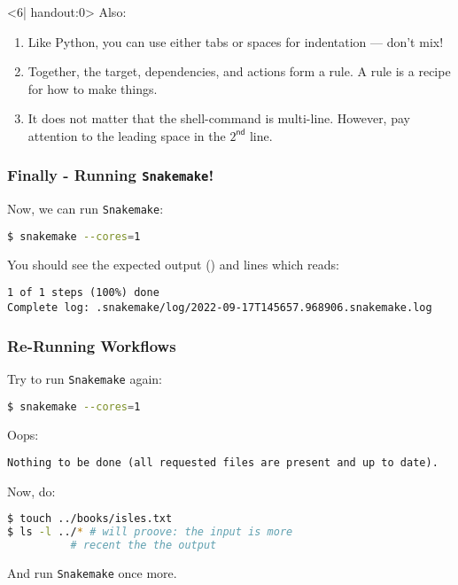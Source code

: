 \begin{frame}[fragile]
\begin{onlyenv}
  \end{onlyenv}
  \begin{onlyenv}<6| handout:0>
  Also:
  \begin{enumerate}
   \item Like Python, you can use either tabs or spaces for indentation — don’t mix!
   \item Together, the target, dependencies, and actions form a rule. A rule is a recipe for how to make things.
   \item It does not matter that the shell-command is multi-line. However, pay attention to the leading space in the $2^\mathsf{nd}$ line.
  \end{enumerate}
  \end{onlyenv}
\end{frame}

\begin{frame}[fragile]
  \frametitle{Finally - Running \texttt{Snakemake}!}
  Now, we can run \texttt{Snakemake}:
  \begin{lstlisting}[language=Bash, style=Shell]
$ snakemake --cores=1
  \end{lstlisting}
  You should see the expected output () and lines which reads:
  \begin{lstlisting}[style=Plain, basicstyle=\footnotesize]
1 of 1 steps (100%) done
Complete log: .snakemake/log/2022-09-17T145657.968906.snakemake.log
  \end{lstlisting}
\end{frame}

\begin{frame}[fragile]
  \frametitle{Re-Running Workflows}
  Try to run \texttt{Snakemake} again:
  \begin{lstlisting}[language=Bash, style=Shell]
$ snakemake --cores=1
  \end{lstlisting}
  \pause
  Oops:
  \begin{lstlisting}[style=Plain, basicstyle=\footnotesize]
Nothing to be done (all requested files are present and up to date).
  \end{lstlisting}
  \pause
  Now, do:
  \begin{lstlisting}[language=Bash, style=Shell]
$ touch ../books/isles.txt
$ ls -l ../* # will proove: the input is more 
          # recent the the output
  \end{lstlisting}
  And run \texttt{Snakemake} once more.
\end{frame}

